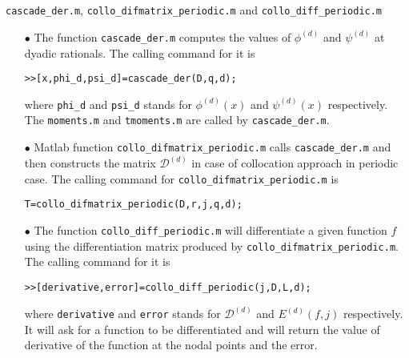\documentclass[acmtoms]{acmtrans2m}
\begin{document}
\section{}\verb#cascade_der.m#, \verb#collo_difmatrix_periodic.m# and \verb#collo_diff_periodic.m#
\begin{itemize}
\item[$\bullet$] The function \verb#cascade_der.m# computes the values of $\phi^{(d)}$ and $\psi^{(d)}$ at dyadic rationals. The calling command for it is
\begin{alltt}
>>[x, phi_d, psi_d]=cascade_der(D,q,d);
\end{alltt}
where \verb#phi_d# and \verb#psi_d# stands for $\phi^{(d)}(x)$ and $\psi^{(d)}(x)$ respectively. The {\tt moments.m} and {\tt tmoments.m} are called by \verb#cascade_der.m#.
\item[$\bullet$] Matlab function \verb#collo_difmatrix_periodic.m# calls \verb#cascade_der.m# and then constructs the matrix
$\mathcal{D}^{(d)}$ in case of collocation approach in periodic case. The calling command for \verb#collo_difmatrix_periodic.m# is
\begin{alltt}
T=collo_difmatrix_periodic(D,r,j,q,d);
\end{alltt}
\item[$\bullet$]
The function \verb#collo_diff_periodic.m# will differentiate a given function $f$ using the differentiation matrix produced by \verb#collo_difmatrix_periodic.m#. The calling command for it is
\begin{alltt}
>>[derivative, error] = collo_diff_periodic(j,D,L,d);
\end{alltt}
where \verb#derivative# and \verb#error# stands for $\mathcal{D}^{(d)}$ and $E^{(d)}(f,j)$ respectively. It will ask for a function to be differentiated and will return the value of derivative of
the function at the nodal points and the error.
\end{itemize}
\end{document}
